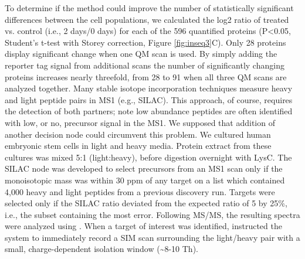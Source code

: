 To determine if the method could improve the number of statistically significant differences between the cell populations, we calculated the log2 ratio of treated vs. control (i.e., 2 days/0 days) for each of the 596 quantified proteins (P<0.05, Student's t-test with Storey correction, Figure \ref{fig:inseq3}C). Only 28 proteins display significant change when one QM scan is used. By simply adding the reporter tag signal from additional scans the number of significantly changing proteins increases nearly threefold, from 28 to 91 when all three QM scans are analyzed together.
Many stable isotope incorporation techniques measure heavy and light peptide pairs in MS1 (e.g., SILAC). This approach, of course, requires the detection of both partners; note low abundance peptides are often identified with low, or no, precursor signal in the MS1. We supposed that addition of another \inseq{} decision node could circumvent this problem. We cultured human embryonic stem cells in light and heavy media. Protein extract from these cultures was mixed 5:1 (light:heavy), before digestion overnight with LysC. The SILAC node was developed to select precursors from an MS1 scan only if the monoisotopic mass was within 30 ppm of any target on a list which contained 4,000 heavy and light peptides from a previous discovery run. Targets were selected only if the SILAC ratio deviated from the expected ratio of 5 by 25\%, i.e., the subset containing the most error. Following MS/MS, the resulting spectra were analyzed using \inseq{}. When a target of interest was identified, \inseq{} instructed the system to immediately record a SIM scan surrounding the light/heavy pair with a small, charge-dependent isolation window (\textasciitilde8-10 Th).

